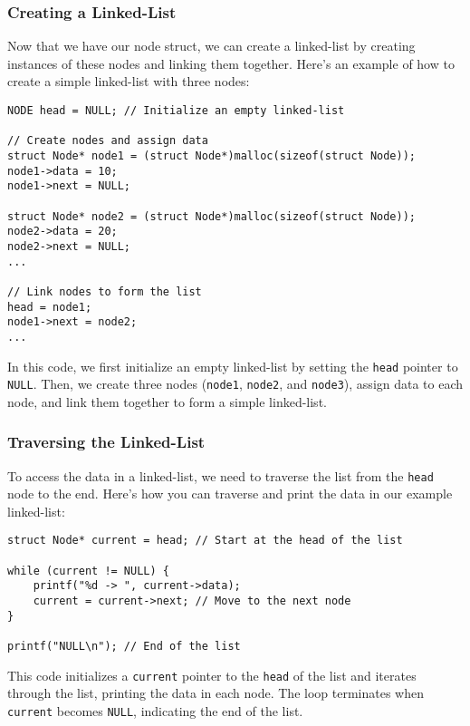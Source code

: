 \documentclass{article}
\begin{document}
\subsubsection{Creating a Linked-List}

Now that we have our node struct, we can create a linked-list by creating instances of these nodes and linking them together. Here's an example of how to create a simple linked-list with three nodes:

\begin{verbatim}
NODE head = NULL; // Initialize an empty linked-list

// Create nodes and assign data
struct Node* node1 = (struct Node*)malloc(sizeof(struct Node));
node1->data = 10;
node1->next = NULL;

struct Node* node2 = (struct Node*)malloc(sizeof(struct Node));
node2->data = 20;
node2->next = NULL;
...

// Link nodes to form the list
head = node1;
node1->next = node2;
...
\end{verbatim}

In this code, we first initialize an empty linked-list by setting the \texttt{head} pointer to \texttt{NULL}. Then, we create three nodes (\texttt{node1}, \texttt{node2}, and \texttt{node3}), assign data to each node, and link them together to form a simple linked-list.

\subsubsection{Traversing the Linked-List}

To access the data in a linked-list, we need to traverse the list from the \texttt{head} node to the end. Here's how you can traverse and print the data in our example linked-list:

\begin{verbatim}
struct Node* current = head; // Start at the head of the list

while (current != NULL) {
    printf("%d -> ", current->data);
    current = current->next; // Move to the next node
}

printf("NULL\n"); // End of the list
\end{verbatim}

This code initializes a \texttt{current} pointer to the \texttt{head} of the list and iterates through the list, printing the data in each node. The loop terminates when \texttt{current} becomes \texttt{NULL}, indicating the end of the list.
\end{document}
